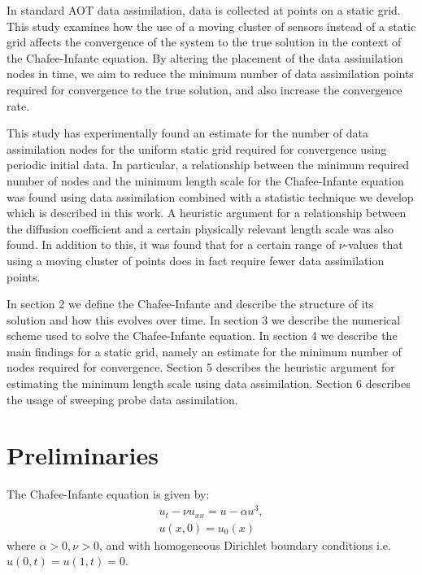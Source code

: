 \documentclass[12pt]{amsart}
\theoremstyle{plain}
\theoremstyle{definition}
\theoremstyle{remark}
\numberwithin{equation}{section} %
\numberwithin{figure}{section}   %
\begin{document}
In standard AOT data assimilation, data is collected at points on a static grid. This study examines how the use of a moving cluster of sensors instead of a static grid affects the convergence of the system to the true solution in the context of the Chafee-Infante equation. By altering the placement of the data assimilation nodes in time, we aim to reduce the minimum number of data assimilation points required for convergence to the true solution, and also increase the convergence rate.

This study has experimentally found an estimate for the number of data assimilation nodes for the uniform static grid required for convergence using periodic initial data. In particular, a relationship between the minimum required number of nodes and the minimum length scale for the Chafee-Infante equation was found using data assimilation combined with a statistic technique we develop which is described in this work. A heuristic argument for a relationship between the diffusion coefficient and a certain physically relevant length scale was also found. In addition to this, it was found that for a certain range of $\nu$-values that using a moving cluster of points does in fact require fewer data assimilation points.

In section 2 we define the Chafee-Infante and describe the structure of its solution and how this evolves over time. In section 3 we describe the numerical scheme used to solve the Chafee-Infante equation. In section 4 we describe the main findings for a static grid, namely an estimate for the minimum number of nodes required for convergence. Section 5 describes the heuristic argument for estimating the minimum length scale using data assimilation. Section 6 describes the usage of sweeping probe data assimilation.

\section{Preliminaries}\label{secPre}
\noindent
The Chafee-Infante equation is given by: 
\begin{align*}
u_t - \nu u_{xx} = u - \alpha u^3,\\
u(x,0) = u_0(x)
\end{align*}
where $\alpha>0, \nu>0$, and with homogeneous Dirichlet boundary conditions i.e. $u(0,t) = u(1,t) = 0$. 
\end{document}
